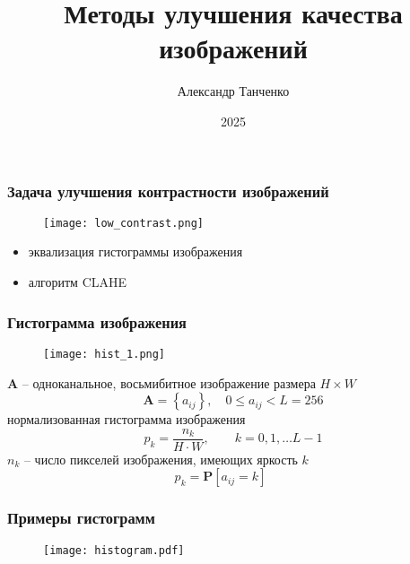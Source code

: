 \documentclass[
    12pt, 
    usepdftitle=false,
    aspectratio=1610
]{beamer}
\title[Лекция 3]{Методы улучшения качества изображений}
\author{Александр Танченко}
\institute{}
\date{2025}
\begin{document}
\begin{frame}
    \titlepage
\end{frame}

\begin{frame}
\frametitle{Задача улучшения контрастности изображений}
\begin{figure}
    \centering
    \texttt{[image: low\_contrast.png]}
\end{figure}
\begin{itemize}
    \item эквализация гистограммы изображения
    \item алгоритм CLAHE
\end{itemize}
\vspace{0.3cm}
\end{frame}


\begin{frame}
\frametitle{Гистограмма изображения}
\begin{figure}
    \centering
    \texttt{[image: hist\_1.png]}
\end{figure}
$\mathbf{A}$ -- одноканальное, восьмибитное изображение размера $H\times W$
    $$
        \mathbf{A}=\left\{a_{ij}\right\},\quad
        0\leqslant a_{ij}<L=256
    $$
    нормализованная гистограмма изображения
    $$
        p_k=\frac{n_k}{H\cdot W},\qquad
        k=0,1,\ldots L-1
    $$
    $n_k$ -- число пикселей изображения, имеющих яркость $k$
    $$
        p_k = \mathbf{P}[a_{ij}=k]\qquad
    $$
\end{frame}

\begin{frame}
    \frametitle{Примеры гистограмм}
    \begin{figure}[t]
        \texttt{[image: histogram.pdf]}
    \end{figure}
\end{frame}
\end{document}
